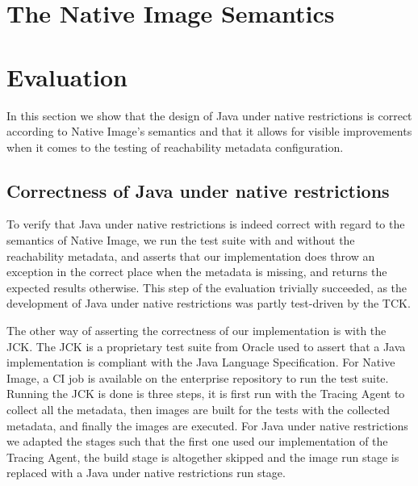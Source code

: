 \chapter{The Native Image Semantics}\label{native_image_specs}




\chapter{Evaluation}
In this section we show that the design of Java under native restrictions is correct according to Native Image's semantics and that it allows for visible improvements when it comes to the testing of reachability metadata configuration.

\section{Correctness of Java under native restrictions}

To verify that Java under native restrictions is indeed correct with regard to the semantics of Native Image, we run the test suite with and without the reachability metadata, and asserts that our implementation does throw an exception in the correct place when the metadata is missing, and returns the expected results otherwise. This step of the evaluation trivially succeeded, as the development of Java under native restrictions was partly test-driven by the TCK.

The other way of asserting the correctness of our implementation is with the JCK. The JCK is a proprietary test suite from Oracle used to assert that a Java implementation is compliant with the Java Language Specification. For Native Image, a CI job is available on the enterprise repository to run the test suite. Running the JCK is done is three steps, it is first run with the Tracing Agent to collect all the metadata, then images are built for the tests with the collected metadata, and finally the images are executed. For Java under native restrictions we adapted the stages such that the first one used our implementation of the Tracing Agent, the build stage is altogether skipped and the image run stage is replaced with a Java under native restrictions run stage.

